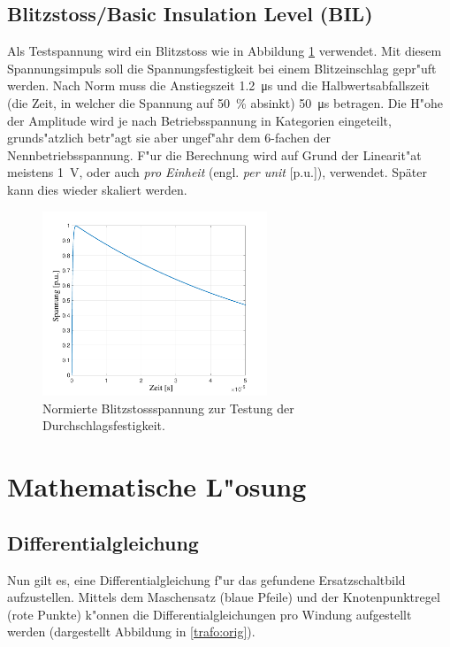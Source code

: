\begin{refsection}
\subsection{Blitzstoss/\textbf{B}asic \textbf{I}nsulation \textbf{L}evel (BIL)}
Als Testspannung wird ein Blitzstoss wie in Abbildung \ref{trafo:BIL} verwendet. Mit diesem Spannungsimpuls soll die Spannungsfestigkeit bei einem Blitzeinschlag gepr"uft werden. Nach Norm muss die Anstiegszeit \SI{1.2}{\micro \second} und die Halbwertsabfallszeit (die Zeit, in welcher die Spannung auf \SI{50}{\percent} absinkt) \SI{50}{\micro \second} betragen. Die H"ohe der Amplitude wird je nach Betriebsspannung in Kategorien eingeteilt, grunds"atzlich betr"agt sie aber ungef"ahr dem 6-fachen der Nennbetriebsspannung. F"ur die Berechnung wird auf Grund der Linearit"at meistens \SI{1}{\volt}, oder auch \textit{pro Einheit} (engl. \textit{per unit} [p.u.]), verwendet. Später kann dies wieder skaliert werden.

\begin{figure}
	\centering
	\includegraphics[width=0.6\textwidth]{./trafo/images/pulse.pdf}
	\caption{Normierte Blitzstossspannung zur Testung der Durchschlagsfestigkeit.}
	\label{trafo:BIL}
\end{figure}

\section{Mathematische L"osung}
\subsection{Differentialgleichung}

Nun gilt es, eine Differentialgleichung f"ur das gefundene Ersatzschaltbild aufzustellen. Mittels dem Maschensatz (blaue Pfeile) und der Knotenpunktregel (rote Punkte) k"onnen die Differentialgleichungen pro Windung aufgestellt werden (dargestellt Abbildung in \ref{trafo:orig}).


\end{refsection}
